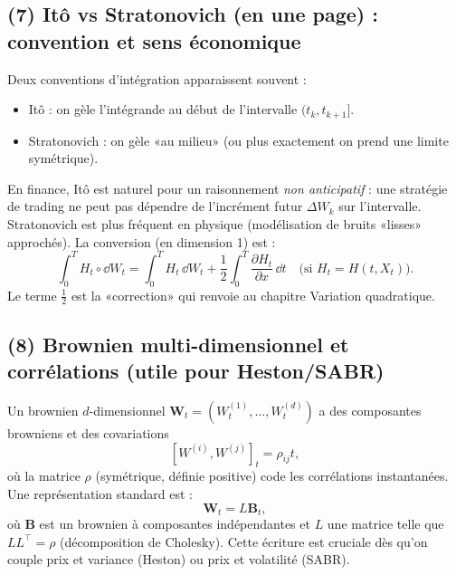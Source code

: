 \subsection*{(7) Itô vs Stratonovich (en une page) : convention et sens économique}
Deux conventions d'intégration apparaissent souvent :
\begin{itemize}[leftmargin=*]
\item Itô : on gèle l'intégrande au début de l'intervalle $(t_k,t_{k+1}]$.
\item Stratonovich : on gèle «au milieu» (ou plus exactement on prend une limite symétrique).
\end{itemize}
En finance, Itô est naturel pour un raisonnement \emph{non anticipatif} : une stratégie de trading ne peut pas dépendre de l'incrément futur $\Delta W_k$ sur l'intervalle.
Stratonovich est plus fréquent en physique (modélisation de bruits «lisses» approchés).
La conversion (en dimension 1) est :
\[
\int_0^T H_t\circ \dd W_t
=\int_0^T H_t\,\dd W_t+\frac12\int_0^T \frac{\partial H_t}{\partial x}\,\dd t
\quad \text{(si }H_t=H(t,X_t)\text{)}.
\]
Le terme $\tfrac12$ est la «correction» qui renvoie au chapitre Variation quadratique.

\subsection*{(8) Brownien multi-dimensionnel et corrélations (utile pour Heston/SABR)}
Un brownien $d$-dimensionnel $\bm{W}_t=(W_t^{(1)},\dots,W_t^{(d)})$ a des composantes browniens et des covariations
\[
[W^{(i)},W^{(j)}]_t=\rho_{ij}t,
\]
où la matrice $\rho$ (symétrique, définie positive) code les corrélations instantanées.
Une représentation standard est :
\[
\bm{W}_t = L\bm{B}_t,
\]
où $\bm{B}$ est un brownien à composantes indépendantes et $L$ une matrice telle que $LL^\top=\rho$ (décomposition de Cholesky).
Cette écriture est cruciale dès qu'on couple prix et variance (Heston) ou prix et volatilité (SABR).
